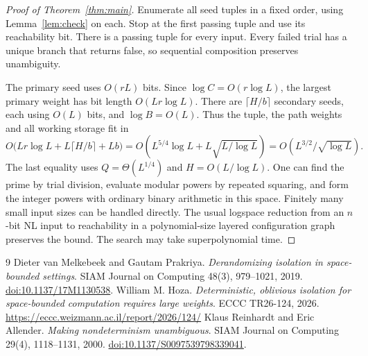 \documentclass[11pt]{article}
\begin{document}
\begin{proof}[Proof of Theorem~\ref{thm:main}]
Enumerate all seed tuples in a fixed order, using Lemma~\ref{lem:check} on each. Stop at the first passing tuple and use its reachability bit. There is a passing tuple for every input. Every failed trial has a unique branch that returns false, so sequential composition preserves unambiguity.

The primary seed uses $O(rL)$ bits. Since $\log C=O(r\log L)$, the largest primary weight has bit length $O(Lr\log L)$. There are $\lceil H/b\rceil$ secondary seeds, each using $O(L)$ bits, and $\log B=O(L)$. Thus the tuple, the path weights and all working storage fit in
\[
  O\bigl(Lr\log L+L\lceil H/b\rceil+Lb\bigr)
  =O\left(L^{5/4}\log L+L\sqrt{L/\log L}\right)
  =O\left(L^{3/2}/\sqrt{\log L}\right).
\]
The last equality uses $Q=\Theta(L^{1/4})$ and $H=O(L/\log L)$. One can find the prime by trial division, evaluate modular powers by repeated squaring, and form the integer powers with ordinary binary arithmetic in this space. Finitely many small input sizes can be handled directly. The usual logspace reduction from an $n$-bit NL input to reachability in a polynomial-size layered configuration graph preserves the bound. The search may take superpolynomial time.
\end{proof}

\begin{thebibliography}{9}
 Dieter van Melkebeek and Gautam Prakriya.
\emph{Derandomizing isolation in space-bounded settings}.
SIAM Journal on Computing 48(3), 979--1021, 2019.
\href{https://doi.org/10.1137/17M1130538}{doi:10.1137/17M1130538}.
 William M. Hoza.
\emph{Deterministic, oblivious isolation for space-bounded computation requires large weights}.
ECCC TR26-124, 2026. \url{https://eccc.weizmann.ac.il/report/2026/124/}
 Klaus Reinhardt and Eric Allender.
\emph{Making nondeterminism unambiguous}.
SIAM Journal on Computing 29(4), 1118--1131, 2000.
\href{https://doi.org/10.1137/S0097539798339041}{doi:10.1137/S0097539798339041}.
\end{thebibliography}
\end{document}

